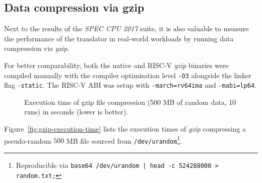 \subsection{Data compression via gzip}
Next to the results of the \textit{SPEC CPU 2017} suite, it is also valuable to measure the performance of the translator in real-world workloads by running data compression via \textit{gzip}.

For better comparability, both the native and RISC-V \textit{gzip} binaries were compiled manually with the compiler optimisation level \texttt{-O3} alongside the linker flag \texttt{-static}.
The RISC-V ABI was setup with \texttt{-march=rv64ima} and \texttt{-mabi=lp64}.

\begin{figure}[h]
	\centering
	\caption[Execution time of gzip compression (500 MB, 10 runs)]%
	{Execution time of gzip file compression (500 MB of random data, 10 runs) in seconds (lower is better).}
	\label{fig:gzip-execution-time}
\end{figure}

Figure~\vref{fig:gzip-execution-time} lists the execution times of \textit{gzip} compressing a pseudo-random $500$ MB file sourced from \texttt{/dev/urandom}\footnote{Reproducible via \texttt{base64 /dev/urandom | head -c 524288000 > random.txt;}}.






















